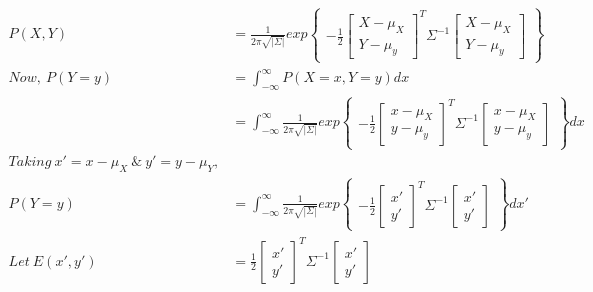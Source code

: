 \documentclass[a4paper,fleqn,11pt]{article}
\theoremstyle{mytheor}
\begin{document}
\begin{align*}
P (X, Y) &  = \frac{1}{2\pi \sqrt{|\Sigma|}}exp \begin{Bmatrix}
		      -\frac{1}{2}
  		   	  \begin{bmatrix}
				X - \mu_X \\
				Y - \mu_y
			  \end{bmatrix}^T
		   	  \Sigma^{-1}
		      \begin{bmatrix}
		   		X - \mu_X \\
				Y - \mu_y
			  \end{bmatrix} \end{Bmatrix} \\
Now,\ P (Y = y) & = \int_{-\infty}^{\infty} P (X = x, Y = y) dx \\
& = \int_{-\infty}^{\infty}
			  \frac{1}{2\pi \sqrt{|\Sigma|}}exp \begin{Bmatrix}
		      -\frac{1}{2}
  		   	  \begin{bmatrix}
				x - \mu_X \\
				y - \mu_y
			  \end{bmatrix}^T
		   	  \Sigma^{-1}
		      \begin{bmatrix}
		   		x - \mu_X \\
				y - \mu_y
			  \end{bmatrix} \end{Bmatrix} dx \\
Taking\ x' = x - \mu_X\ \&\ y' = y - \mu_Y, \\
P (Y = y) & = \int_{-\infty}^{\infty}
			  \frac{1}{2\pi \sqrt{|\Sigma|}}exp \begin{Bmatrix}
		      -\frac{1}{2}
  		   	  \begin{bmatrix}
				x' \\
				y'
			  \end{bmatrix}^T
		   	  \Sigma^{-1}
		      \begin{bmatrix}
		   		x' \\
				y'
			  \end{bmatrix} \end{Bmatrix} dx' \\
Let\ E (x', y') & =  \frac{1}{2}
  		   			  \begin{bmatrix}
						x' \\
						y'
			 		  \end{bmatrix}^T
				   	  \Sigma^{-1}
				      \begin{bmatrix}
		   				x' \\
						y'
					  \end{bmatrix} \\

\end{align*}
\end{document}
